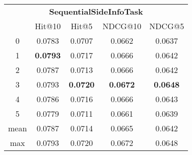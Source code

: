 \documentclass{article}
\begin{document}
 

\begin{tabular}{c|cccc}

\multicolumn{5}{c}{\textbf{SequentialSideInfoTask}} \\
\noalign{\smallskip}
\noalign{\smallskip}
\toprule
\multicolumn{1}{c}{Template ID} & \multicolumn{1}{|c}{Hit@10} & \multicolumn{1}{c}{Hit@5} & \multicolumn{1}{c}{NDCG@10} & \multicolumn{1}{c}{NDCG@5} \\
\midrule
0 & 0.0783 & 0.0707 & 0.0662 & 0.0637 \\
1 & \textbf{0.0793} & 0.0717 & 0.0666 & 0.0642 \\
2 & 0.0787 & 0.0713 & 0.0666 & 0.0642 \\
3 & 0.0793 & \textbf{0.0720} & \textbf{0.0672} & \textbf{0.0648} \\
4 & 0.0786 & 0.0716 & 0.0666 & 0.0643 \\
5 & 0.0779 & 0.0711 & 0.0661 & 0.0639 \\
\midrule
mean & 0.0787 & 0.0714 & 0.0665 & 0.0642 \\
max & 0.0793 & 0.0720 & 0.0672 & 0.0648 \\
\bottomrule

\end{tabular}
\end{document}
